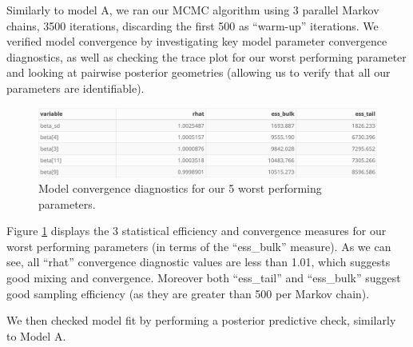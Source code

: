 \documentclass[
]{article}
\begin{document}
Similarly to model A, we ran our MCMC algorithm using 3 parallel Markov chains, 3500 iterations, discarding the first 500 as ``warm-up'' iterations. We verified model convergence by investigating key model parameter convergence diagnostics, as well as checking the trace plot for our worst performing parameter and looking at pairwise posterior geometries (allowing us to verify that all our parameters are identifiable).

\begin{figure}

{\centering \includegraphics[width=1\linewidth]{../outputs/bayesian-analysis-monthly-freq/model-no-year-effect/no-year-model-diagnostics} 

}

\caption{Model convergence diagnostics for our 5 worst performing parameters.}\label{fig:figs11}
\end{figure}

Figure \ref{fig:figs11} displays the 3 statistical efficiency and convergence measures for our worst performing parameters (in terms of the ``ess\_bulk'' measure). As we can see, all ``rhat'' convergence diagnostic values are less than 1.01, which suggests good mixing and convergence. Moreover both ``ess\_tail'' and ``ess\_bulk'' suggest good sampling efficiency (as they are greater than 500 per Markov chain).

We then checked model fit by performing a posterior predictive check, similarly to Model A.
\end{document}
